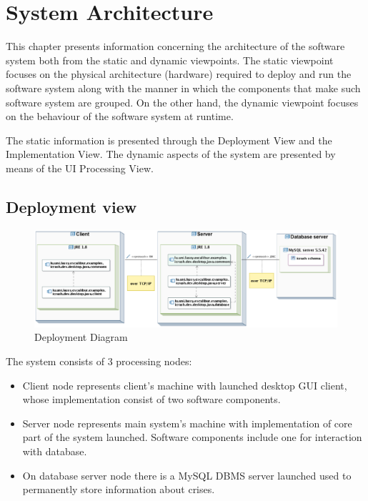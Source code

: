 \chapter{System Architecture}
\label{chap:arch}

This chapter presents information concerning the architecture of the software
system both from the static and dynamic viewpoints. The static viewpoint focuses
on the physical architecture (hardware) required to deploy and run the
software system along with the manner in which the components that make such
software system are grouped. On the other hand, the dynamic viewpoint focuses on
the behaviour of the software system at runtime. 

The static information is presented through the \gls{Deployment View} and the
\gls{Implementation View}. The dynamic aspects of the system are presented by
means of the \gls{UI Processing View}.


\section{Deployment view}

\begin{figure}[H]
\begin{center}
  \includegraphics[width=450px]{images/architecture/deployment-view/deployment_diagram.eps}
  \caption{Deployment Diagram}
  \label{deploy-diagram}
\end{center}
\end{figure}

The system consists of 3 processing nodes:
\begin{itemize}
  \item Client node represents client's machine with launched desktop GUI
  client, whose implementation consist of two software components.
  \item Server node represents main system's machine with implementation of core
  part of the system launched. Software components include one for interaction
  with database.
  \item On database server node there is a MySQL DBMS server launched used to
  permanently store information about crises. 
\end{itemize}
 
